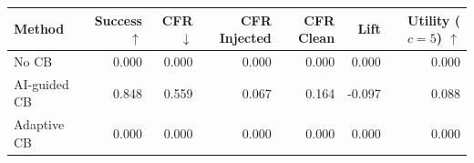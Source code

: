 \begin{tabular}{lrrrrrr}
\toprule
Method & Success $\uparrow$ & CFR $\downarrow$ & CFR Injected & CFR Clean & Lift & Utility ($c=5$) $\uparrow$ \\
\midrule
No CB & 0.000 & 0.000 & 0.000 & 0.000 & 0.000 & 0.000 \\
AI-guided CB & 0.848 & 0.559 & 0.067 & 0.164 & -0.097 & 0.088 \\
Adaptive CB & 0.000 & 0.000 & 0.000 & 0.000 & 0.000 & 0.000 \\
\bottomrule
\end{tabular}

